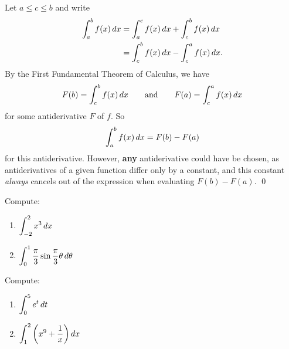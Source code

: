 \documentclass[10pt,t,handout,ignorenonframetext,aspectratio=169]{beamer}
\begin{document}
\begin{frame}
  \vs
  Let $a\le c\le b$ and write
  \begin{align*}
    \int_a^b f(x) \mathop{}\!d x &= \int_a^c f(x) \mathop{}\!d x + \int_c^b f(x) \mathop{}\!d x \\
                       &= \int_c^b f(x) \mathop{}\!d x - \int_c^a f(x) \mathop{}\!d x.
  \end{align*}
  By the First Fundamental Theorem of Calculus, we have
  \[
    F(b) = \int_c^b f(x) \mathop{}\!d x\qquad\text{and}\qquad F(a) = \int_c^a f(x) \mathop{}\!d x
  \]
  for some antiderivative $F$ of $f$. So
  \[
    \int_a^b f(x) \mathop{}\!d x = F(b)-F(a)
  \]
  for this antiderivative. However, \textbf{any} antiderivative
  could have be chosen, as antiderivatives of a given function
  differ only by a constant, and this constant \textit{always}
  cancels out of the expression when evaluating $F(b)-F(a)$.
  \qed{}
\end{frame}

\begin{frame}
  \vs
  \begin{question}
    Compute:
    \begin{enumerate}
    \item $\displaystyle \int_{-2}^2 x^3\mathop{}\!d x$
      \vfill
    \item $\displaystyle \int_0^1 \frac{\pi}{3} \sin \frac{\pi}{3}\theta \mathop{}\!d
      \theta$
      \vfill
    \end{enumerate}
  \end{question}
\end{frame}

\begin{frame}
  \vs
  \begin{question}
    Compute:
    \begin{enumerate}
    \item $\displaystyle \int_0^5 e^t\mathop{}\!d t$
      \vfill
    \item $\displaystyle \int_1^2\left(x^9 + \frac{1}{x}\right) \mathop{}\!d x$
      \vfill
    \end{enumerate}
  \end{question}
\end{frame}
\end{document}
